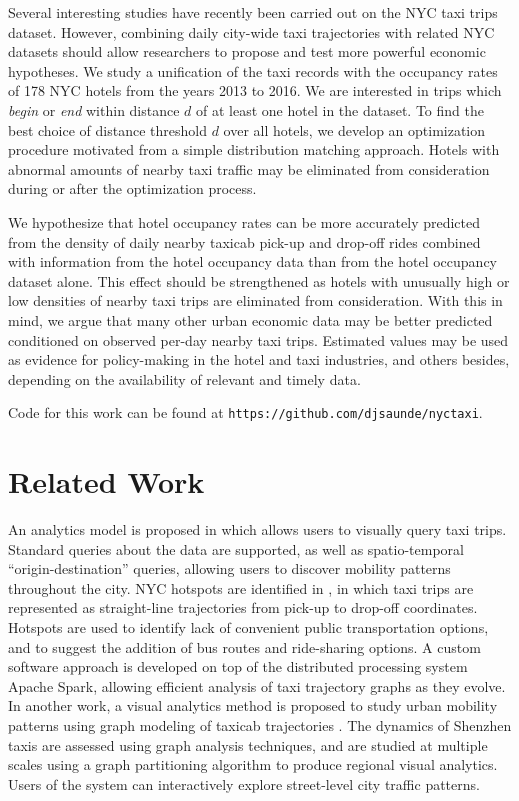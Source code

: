 \documentclass[useAMS, usenatbib]{biom}
\begin{document}
Several interesting studies have recently been carried out on the NYC taxi trips dataset. However, combining daily city-wide taxi trajectories with related NYC datasets should allow researchers to propose and test more powerful economic hypotheses. We study a unification of the taxi records with the occupancy rates of 178 NYC hotels from the years 2013 to 2016. We are interested in trips which \textit{begin} or \textit{end} within distance $d$ of at least one hotel in the dataset. To find the best choice of distance threshold $d$ over all hotels, we develop an optimization procedure motivated from a simple distribution matching approach. Hotels with abnormal amounts of nearby taxi traffic may be eliminated from consideration during or after the optimization process.

We hypothesize that hotel occupancy rates can be more accurately predicted from the density of daily nearby taxicab pick-up and drop-off rides combined with information from the hotel occupancy data than from the hotel occupancy dataset alone. This effect should be strengthened as hotels with unusually high or low densities of nearby taxi trips are eliminated from consideration. With this in mind, we argue that many other urban economic data may be better predicted conditioned on observed per-day nearby taxi trips. Estimated values may be used as evidence for policy-making in the hotel and taxi industries, and others besides, depending on the availability of relevant and timely data.

Code for this work can be found at \texttt{https://github.com/djsaunde/nyctaxi}.



\section{Related Work}
\label{s:related}

An analytics model is proposed in \citet{Ferreira2013VisualEO} which allows users to visually query taxi trips. Standard queries about the data are supported, as well as spatio-temporal ``origin-destination'' queries, allowing users to discover mobility patterns throughout the city. NYC hotspots are identified in \citet{Stoyanovich2017ZoomingIO}, in which taxi trips are represented as straight-line trajectories from pick-up to drop-off coordinates. Hotspots are used to identify lack of convenient public transportation options, and to suggest the addition of bus routes and ride-sharing options. A custom software approach is developed on top of the distributed processing system Apache Spark, allowing efficient analysis of taxi trajectory graphs as they evolve. In another work, a visual analytics method is proposed to study urban mobility patterns using graph modeling of taxicab trajectories \citep{Huang2016TrajGraphAG}. The dynamics of Shenzhen taxis are assessed using graph analysis techniques, and are studied at multiple scales using a graph partitioning algorithm to produce regional visual analytics. Users of the system can interactively explore street-level city traffic patterns. 
\end{document}
